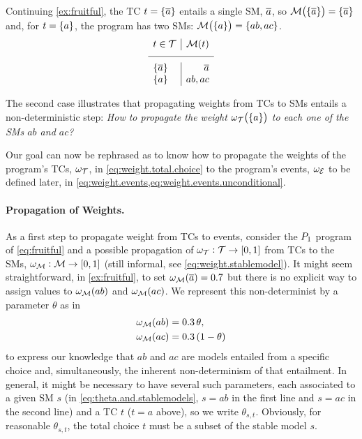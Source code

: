 \documentclass[x11names]{tlp}
\renewcommand{\cite}{\citep}
\begin{document}
\ifExamples
	\begin{example}%
		\em

		Continuing \cref{ex:fruitful}, the \acl{TC} $t = \set{\ensuremath{\overline{a}}}$ entails a
		single \acl{SM}, $\overline{a}$, so $ \MODELset\at{\set{\co{a}}} = \set{\co{a}} $
		and, for $t = \set{a}$, the program has two \aclp{SM}: $
			\MODELset\at{\set{a}} = \set{ab, ac}$.
		\begin{equation*}
			\begin{array}{l|r}
				t \in \TCHOICEset   & \MODELset\at{t} %
				\\
				\hline \set{\co{a}} & \co{a}          %
				\\
				\set{a}             & ab, ac
			\end{array}
		\end{equation*}

		The second case illustrates that propagating weights from \aclp{TC} to
		\aclp{SM} entails a non-deterministic step: \textit{How to propagate the
			weight $\wgtT\at{\set{a}}$ to each one of the \aclp{SM} $ab$ and $ac$?}
	\end{example}
\fi

Our goal can now be rephrased as to know how to propagate the weights of the program's \aclp{TC}, $\omega_{{\mathcal{T}}}$, in \cref{eq:weight.total.choice}
to the program's events, $\omega_{{\mathcal{E}}}$ to be defined later, in \cref{eq:weight.events,eq:weight.events.unconditional}.



\paragraph{Propagation of Weights.}

As a first step to propagate weight from \aclp{TC} to events, consider the $P_{\mathrm{1}}$ program of \cref{eq:fruitful} and a possible propagation of $\wgtT:\TCHOICEset \to \intcc{0,1}$ from \aclp{TC} to the \aclp{SM}, $\wgtM:\MODELset \to \intcc{0,1}$ (still informal, see \cref{eq:weight.stablemodel}).
%
%
It might seem straightforward, in \cref{ex:fruitful}, to set $\wgtM\at{\co{a}}=0.7$ but there is no explicit way to assign values to $\wgtM\at{ab}$ and $\wgtM\at{ac}$.
We represent this non-determinist by a parameter $\theta$ as in
\begin{equation}
	\begin{aligned}
		\wgtM\at{ab} & = 0.3\, \theta,
		\\
		\wgtM\at{ac} & = 0.3\, (1 - \theta)
	\end{aligned}\label{eq:theta.and.stablemodels}
\end{equation}
to express our knowledge that $ab$ and $ac$ are models entailed from a specific choice and, simultaneously, the inherent non-determinism of that entailment.
In general, it might be necessary to have several such parameters, each associated to a given \acl{SM} $s$ (in \cref{eq:theta.and.stablemodels}, $s = ab$ in the first line and $s = ac$ in the second line) and a \acl{TC} $t$ ($t=a$ above), so we write $\theta_{s,t}$.
Obviously, for reasonable $\theta_{s,t}$, the total choice $t$ must be a subset of the stable model $s$.
\end{document}
